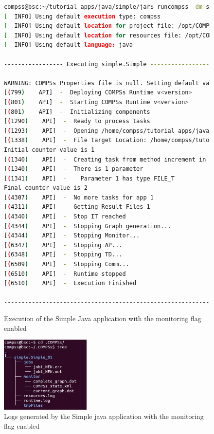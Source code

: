 \begin{figure}[ht!]
  \centering
  \begin{lstlisting}[language=bash]
compss@bsc:~/tutorial_apps/java/simple/jar$ runcompss -dm simple.Simple 1
[  INFO] Using default execution type: compss
[  INFO] Using default location for project file: /opt/COMPSs/Runtime/configuration/xml/projects/default_project.xml
[  INFO] Using default location for resources file: /opt/COMPSs/Runtime/configuration/xml/resources/default_resources.xml
[  INFO] Using default language: java

----------------- Executing simple.Simple --------------------------

WARNING: COMPSs Properties file is null. Setting default values
[(799)    API]  -  Deploying COMPSs Runtime v<version>
[(801)    API]  -  Starting COMPSs Runtime v<version>
[(801)    API]  -  Initializing components
[(1290)    API]  -  Ready to process tasks
[(1293)    API]  -  Opening /home/compss/tutorial_apps/java/simple/jar/counter in mode OUT
[(1338)    API]  -  File target Location: /home/compss/tutorial_apps/java/simple/jar/counter
Initial counter value is 1
[(1340)    API]  -  Creating task from method increment in simple.SimpleImpl
[(1340)    API]  -  There is 1 parameter
[(1341)    API]  -    Parameter 1 has type FILE_T
Final counter value is 2
[(4307)    API]  -  No more tasks for app 1
[(4311)    API]  -  Getting Result Files 1
[(4340)    API]  -  Stop IT reached
[(4344)    API]  -  Stopping Graph generation...
[(4344)    API]  -  Stopping Monitor...
[(6347)    API]  -  Stopping AP...
[(6348)    API]  -  Stopping TD...
[(6509)    API]  -  Stopping Comm...
[(6510)    API]  -  Runtime stopped
[(6510)    API]  -  Execution Finished

------------------------------------------------------------
  \end{lstlisting}
  \caption{Execution of the Simple Java application with the monitoring flag enabled}
  \label{fig:simple_exec_monitor}
\end{figure}


\begin{figure}[ht!]
  \centering
    \includegraphics[width=0.4\textwidth]{./Sections/4_Tools/Figures/logs_with_monitor.jpeg}
    \caption{Logs generated by the Simple java application with the monitoring flag enabled}
    \label{fig:simple_logs_monitor}
\end{figure}

